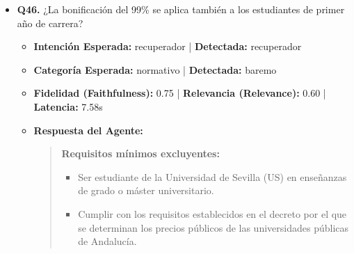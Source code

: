 \documentclass[12pt,a4paper,oneside]{report}
\begin{document}
\begin{itemize}
\begin{itemize}
\begin{itemize}
                  \item \href{https://educacion.us.es/participa/estudiantes/delegacion-de-estudiantes/103-el-centro/1-2-secretaria-administracion/1-2-0-secretaria-del-centro/691-preguntas-frecuentes-secretaria}{PREGUNTAS FRECUENTES SECRETARÍA - Facultad de CC de la...}
                  \item R.R. NORMAS DE MATRICULA GRADO Y MASTER UNIVERSITARIO 2025-2026.pdf (Página 23)
                  \item R.R. NORMAS DE MATRICULA GRADO Y MASTER UNIVERSITARIO 2025-2026.pdf (Página 29)
                  \item \href{https://educacion.us.es/el-centro/secretaria-administracion/secretaria/103-el-centro/1-2-secretaria-administracion/1-2-0-secretaria-del-centro/691-preguntas-frecuentes-secretaria}{PREGUNTAS FRECUENTES SECRETARÍA - Facultad de CC de la...}
                \end{itemize}
        \end{itemize}

  
\item \textbf{Q46.} ¿La bonificación del 99\% se aplica también a los estudiantes de primer año de carrera? \\
        \begin{itemize}
          \item \textbf{Intención Esperada:} recuperador | \textbf{Detectada:} recuperador
          \item \textbf{Categoría Esperada:} normativo | \textbf{Detectada:} baremo
          \item \textbf{Fidelidad (Faithfulness):} 0.75 | \textbf{Relevancia (Relevance):} 0.60 | \textbf{Latencia:} 7.58s
          \item \textbf{{Respuesta del Agente:}} \\
                \begin{quote}

\noindent\textbf{Requisitos mínimos excluyentes:}\\

\begin{itemize}
  \item Ser estudiante de la Universidad de Sevilla (US) en enseñanzas de grado o máster universitario.
  \item Cumplir con los requisitos establecidos en el decreto por el que se determinan los precios públicos de las universidades públicas de Andalucía.
\end{itemize}



\end{quote}
\end{itemize}
\end{itemize}
\end{document}
